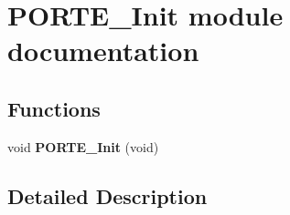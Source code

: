 \hypertarget{group___p_o_r_t_e___init__module}{}\section{P\+O\+R\+T\+E\+\_\+\+Init module documentation}
\label{group___p_o_r_t_e___init__module}
\subsection*{Functions}
\begin{DoxyCompactItemize}
\item 
void {\bfseries P\+O\+R\+T\+E\+\_\+\+Init} (void)\hypertarget{group___p_o_r_t_e___init__module_ga2162d4f7616c955b58f911db6e970eb6}{}\label{group___p_o_r_t_e___init__module_ga2162d4f7616c955b58f911db6e970eb6}

\end{DoxyCompactItemize}


\subsection{Detailed Description}

